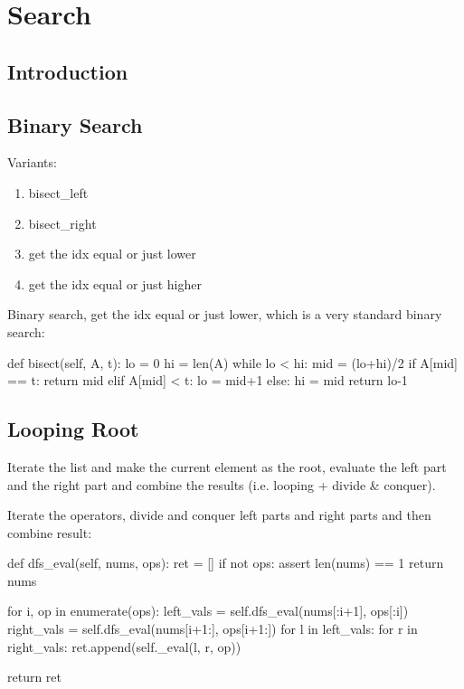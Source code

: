 \chapter{Search}


\section{Introduction}

\section{Binary Search}
Variants:
\begin{enumerate}
\item bisect\_left
\item bisect\_right
\item get the idx equal or just lower 
\item get the idx equal or just higher 
\end{enumerate}
Binary search, get the idx equal or just lower, which is a very standard binary search:
\begin{python}
def bisect(self, A, t):
    lo = 0
    hi = len(A)
    while lo < hi:
        mid = (lo+hi)/2
        if A[mid] == t:
            return mid
        elif A[mid] < t:
            lo = mid+1
        else:
            hi = mid
    return lo-1
\end{python}

\section{Looping Root}
Iterate the list and make the current element as the root, evaluate the left part and the right part and combine the results (i.e. looping + divide \& conquer). 

 Iterate the operators, divide and conquer left parts and right parts and then combine result:
\begin{python}
def dfs_eval(self, nums, ops):
    ret = []
    if not ops:
        assert len(nums) == 1
        return nums

    for i, op in enumerate(ops):
        left_vals = self.dfs_eval(nums[:i+1], ops[:i])
        right_vals = self.dfs_eval(nums[i+1:], ops[i+1:])
        for l in left_vals:
            for r in right_vals:
                ret.append(self._eval(l, r, op))

    return ret
\end{python}

